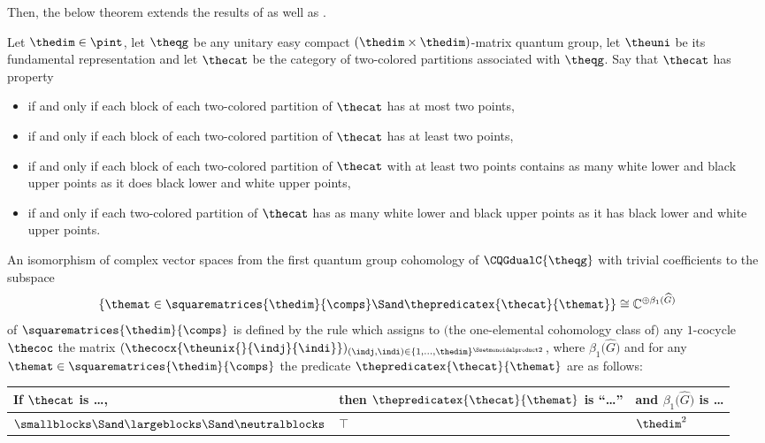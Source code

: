 \documentclass[pdftex]{sigma}
\numberwithin{equation}{section}
\begin{document}
{Then, the below theorem extends the results  of  \cite{BichonFranzGerhold2017,DasFranzKulaSkalski2018} as well as \cite{Wendel2020}.
  \begin{theorem*}
Let $\thedim\in\pint$, let $\theqg$ be any unitary easy compact $(\thedim\times\thedim)$-matrix quantum group, let  $\theuni$ be its fundamental representation and let $\thecat$ be the category of two-co\-lo\-red partitions associated with $\theqg$. Say that $\thecat$ has property
  \begin{itemize}\itemsep=0pt
  \item[$(1)$] if and only if  each block of each two-co\-lo\-red partition of $\thecat$ has at most two points,
    \item[$(2)$] if and only if  each block of each two-co\-lo\-red partition of $\thecat$ has at least two points,
  \item[$(3)$] if and only if  each block of each two-co\-lo\-red partition of $\thecat$ with at least two points contains as many  white lower and black upper points as it does black lower and white upper points,
  \item[$(4)$]    if and only if each two-co\-lo\-red partition of $\thecat$ has as many white lower and black upper points as it has black lower and white upper points.
  \end{itemize}
An isomorphism of complex vector spaces from the first quantum group cohomology of $\CQGdualC{\theqg}$ with trivial coefficients to the subspace
  \[
 \{\themat\in\squarematrices{\thedim}{\comps}\Sand \thepredicatex{\thecat}{\themat}\}
\cong \mathbb{C}^{\oplus \beta_1(\widehat{G})}
  \]
  of $\squarematrices{\thedim}{\comps}$ is defined by the rule which assigns to $($the one-elemental cohomology class of$)$ any $1$-cocycle $\thecoc$ the matrix $ (\thecocx{\theunix{}{\indj}{\indi}} )_{(\indj,\indi)\in \{1,\ldots,\thedim\}^{\Ssetmonoidalproduct 2}}$,
 where
  $\beta_1 \bigl(\widehat{G} \bigr)$ and for any $\themat\in \squarematrices{\thedim}{\comps}$ the predicate $\thepredicatex{\thecat}{\themat}$ are as follows:
  \begin{table}[h]\centering\renewcommand{\arraystretch}{1.2}
  \begin{tabular}{p{}|p{}|p{}}
    If $\thecat$ is \ldots, & then $\thepredicatex{\thecat}{\themat}$ is ``\ldots'' & and $\beta_1 \bigl(\widehat{G} \bigr)$ is \ldots \\ \hline
$\smallblocks \Sand \largeblocks\Sand\neutralblocks$                            & $\top$ & $\thedim^2$  \Tstrut \\

\end{tabular}
\end{table}
\end{theorem*}}
\end{document}

